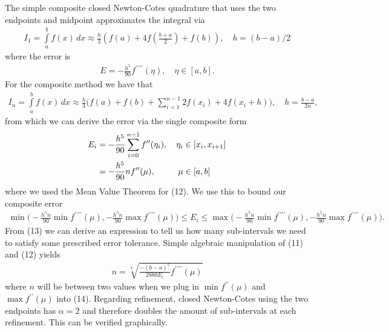 \documentclass[12pt]{article}
\theoremstyle{remark}
\begin{document}
The simple composite closed Newton-Cotes quadrature that uses the two endpoints and midpoint approximates the integral via
\begin{align}
I_1 = \displaystyle\int\limits_a^b f(x) \, dx \approx \frac{h}{3}(f(a) + 4f(\frac{b+a}{2}) + f(b)), \quad h = (b - a)/2
\end{align}
where the error is 
\begin{align}
E = -\frac{h^5}{90}f^{\prime\prime\prime\prime}(\eta), \quad \eta \in [a,b].
\end{align}
For the composite method we have that 
\begin{align}
I_n = \displaystyle\int\limits_a^b f(x) \, dx \approx \frac{h}{3}\bigg( f(a) + f(b) + \sum\limits_{i=1}^{n-1} 2f(x_i) + 4f(x_i + h) \bigg), \quad h = \frac{b-a}{2n},
\end{align}
from which we can derive the error via the single composite form 
\begin{align}
E_i & = -\frac{h^5}{90}\sum\limits_{i=0}^{n-1} f^{\prime\prime}(\eta_i), \quad \eta_i \in [x_i, x_{i+1}] \\
& = -\frac{h^5}{90}nf^{\prime\prime}(\mu), \quad \hskip 0.6cm \mu \in [a,b]
\end{align}
where we used the Mean Value Theorem for (12). We use this to bound our composite error 
\begin{align}
\min\bigg(-\frac{h^5n}{90}\min f^{\prime\prime\prime\prime}(\mu),-\frac{h^5n}{90}\max f^{\prime\prime\prime\prime}(\mu) \bigg) \leq E_i \leq \max\bigg(-\frac{h^5n}{90}\min f^{\prime\prime\prime\prime}(\mu),-\frac{h^5n}{90}\max f^{\prime\prime\prime\prime}(\mu) \bigg).
\end{align}
From (13) we can derive an expression to tell us how many sub-intervals we need to satisfy some prescribed error tolerance. Simple algebraic manipulation of (11) and (12) yields
\begin{align}
n = \sqrt[4]{\frac{-(b-a)^5}{2880E_i}f^{\prime\prime\prime\prime}(\mu)}
\end{align}
where $n$ will be between two values when we plug in $\min f^{\prime\prime}(\mu)$ and $\max f^{\prime\prime}(\mu)$ into (14).
Regarding refinement, closed Newton-Cotes using the two endpoints has $\alpha = 2$ and therefore doubles the amount of sub-intervals at each refinement. This can be verified graphically.
\end{document}
